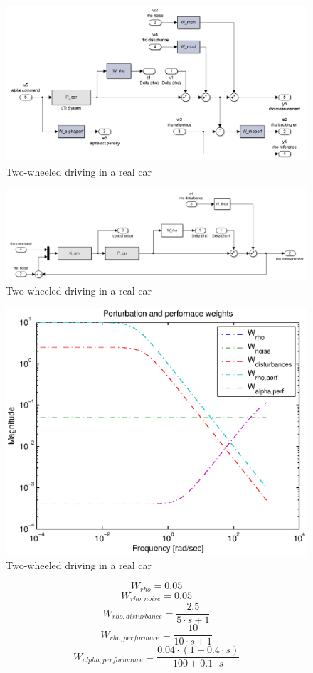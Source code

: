 \documentclass[conference]{IEEEtran}
\begin{document}
\begin{figure}[h]
\centering
  \includegraphics[width=.47\textwidth]{pics/model_car.png} 
  \caption{Two-wheeled driving in a real car}  
  \label{figure:arab_driving}
\end{figure}


\begin{figure}[h]
\centering
  \includegraphics[width=.47\textwidth]{pics/model_car_unweighted.png} 
  \caption{Two-wheeled driving in a real car}  
  \label{figure:arab_driving}
\end{figure}



\begin{figure}[h]
\centering
  \includegraphics[width=.47\textwidth]{pics/weights.eps} 
  \caption{Two-wheeled driving in a real car}  
  \label{figure:arab_driving}
\end{figure}

\begin{equation}
{W_{rho}} = 0.05
\end{equation}
\begin{equation}
{W_{rho,noise}} = 0.05
\end{equation}
\begin{equation}
{W_{rho,disturbance}} = \frac{{2.5}}{{5 \cdot s + 1}}
\end{equation}
\begin{equation}
{W_{rho,performace}} = \frac{{10}}{{10 \cdot s + 1}}
\end{equation}
\begin{equation}
{W_{alpha,performance}} = \frac{{0.04 \cdot \left( {1 + 0.4 \cdot s} \right)}}{{100 + 0.1 \cdot s}}
\end{equation}
\end{document}
